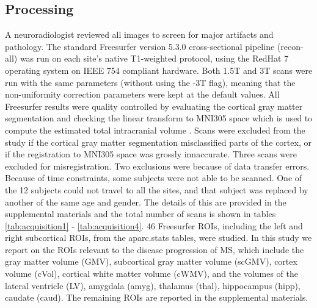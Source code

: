 \subsection{Processing}
 A neuroradiologist reviewed all images to screen for major artifacts and pathology. The standard Freesurfer \cite{freesurferPaper} version 5.3.0 cross-sectional pipeline (recon-all) was run on each site's native T1-weighted protocol, using the RedHat 7 operating system on IEEE 754 compliant hardware. Both 1.5T and 3T scans were run with the same parameters (without using the -3T flag), meaning that the non-uniformity correction parameters were kept at the default values. All Freesurfer results were quality controlled by evaluating the cortical gray matter segmentation and checking the  linear transform to MNI305 space which is used to compute the estimated total intracranial volume \cite{buckner2004unified}. Scans were excluded from the study if the cortical gray matter segmentation misclassified parts of the cortex, or if the registration to MNI305 space was grossly innaccurate. Three scans were excluded for misregistration. Two exclusions were because of data transfer errors. Because of time constraints, some subjects were not able to be scanned. One of the 12 subjects could not travel to all the sites, and that subject was replaced by another of the same age and gender. The details of this are provided in the supplemental materials and the total number of scans is shown in tables \ref{tab:acquisition1} - \ref{tab:acquisition4}. 46 Freesurfer ROIs, including the left and right subcortical ROIs, from the aparc.stats tables, were studied. In this study we report on the ROIs relevant to the disease progression of MS, which include the gray matter volume (GMV), subcortical gray matter volume (scGMV), cortex volume (cVol), cortical white matter volume (cWMV), and the volumes of the lateral ventricle (LV), amygdala (amyg), thalamus (thal), hippocampus (hipp), caudate (caud). The remaining ROIs are reported in the supplemental materials. 